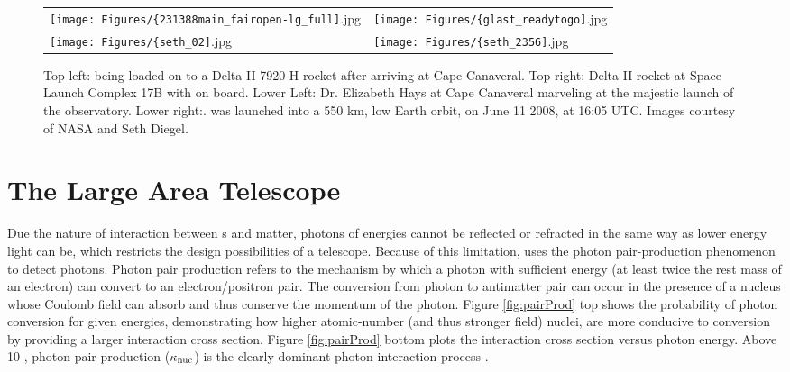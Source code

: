 \begin{figure}[!]
	\begin{center}
		\hspace*{-1.5cm} \begin{tabular}{ll}
			\texttt{[image: Figures/\{231388main\_fairopen-lg\_full]}.jpg} &
			\texttt{[image: Figures/\{glast\_readytogo]}.jpg} \\
			
			\texttt{[image: Figures/\{seth\_02]}.jpg} &
			\texttt{[image: Figures/\{seth\_2356]}.jpg} \\

		\end{tabular}
	\end{center}
	\caption[\Fermi{} launch images.]{
		\label{fig:Launch}{Top left: \Fermi{} being loaded on to a Delta II 7920-H rocket after arriving at Cape Canaveral. Top right: Delta II rocket  at Space Launch Complex 17B with \Fermi{} on board. Lower Left: Dr. Elizabeth Hays at Cape Canaveral marveling at the majestic launch of the \Fermi{} observatory. Lower right:.\Fermi{} was launched into a 550 km, low Earth orbit, on June 11 2008, at 16:05 UTC. Images courtesy of NASA and Seth Diegel.}
	}
\end{figure}

\section{\label{FGST:LAT}The Large Area Telescope}
Due the nature of interaction between \gam{}s and matter, photons of \gam{} energies cannot be reflected or refracted in the same way as lower energy light can be, which restricts the design possibilities of a \gam{} telescope. Because of this limitation, \Fermi{} uses the photon pair-production phenomenon to detect \gam{} photons. Photon pair production refers to the mechanism by which a
photon with sufficient energy (at least twice the rest mass of an electron) can convert to an electron/positron pair. The conversion from photon to antimatter pair can occur in the presence of a nucleus whose Coulomb field can absorb and thus conserve the momentum of the photon. Figure \ref{fig:pairProd} top shows the probability of photon conversion for given energies, demonstrating how higher atomic-number (and thus stronger field) nuclei, are more conducive to conversion by providing a larger interaction cross section. Figure \ref{fig:pairProd} bottom plots the interaction cross section versus photon energy. Above 10 \mev{}, photon pair production (${\rm \kappa_{nuc}}$) is the clearly dominant photon interaction process \citep{Beringer12}.

